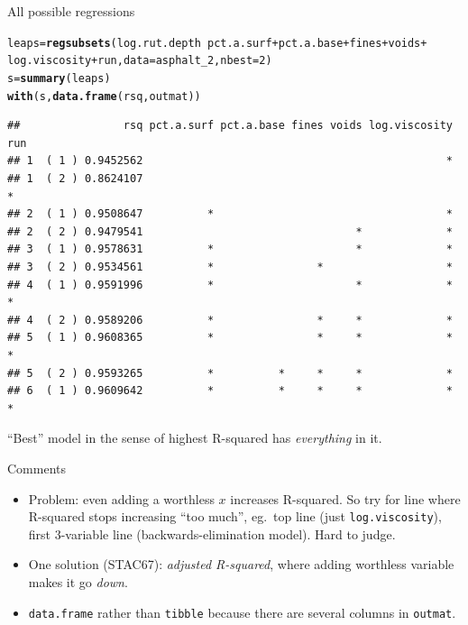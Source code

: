 \documentclass[unknownkeysallowed]{beamer}\usepackage[]{graphicx}\usepackage[]{color}
\makeatletter
\newcommand{\hlnum}[1]{\textcolor[rgb]{0.686,0.059,0.569}{#1}}%
\newcommand{\hlopt}[1]{\textcolor[rgb]{0,0,0}{#1}}%
\newcommand{\hlstd}[1]{\textcolor[rgb]{0.345,0.345,0.345}{#1}}%
\newcommand{\hlkwb}[1]{\textcolor[rgb]{0.69,0.353,0.396}{#1}}%
\newcommand{\hlkwc}[1]{\textcolor[rgb]{0.333,0.667,0.333}{#1}}%
\newcommand{\hlkwd}[1]{\textcolor[rgb]{0.737,0.353,0.396}{\textbf{#1}}}%
\newenvironment{kframe}{%
 \def\at@end@of@kframe{}%
 \ifinner\ifhmode%
  \def\at@end@of@kframe{\end{minipage}}%
  \begin{minipage}{\columnwidth}%
 \fi\fi%
 \def\FrameCommand##1{\hskip\@totalleftmargin \hskip-\fboxsep
 \colorbox{shadecolor}{##1}\hskip-\fboxsep
     \hskip-\linewidth \hskip-\@totalleftmargin \hskip\columnwidth}%
 \MakeFramed {\advance\hsize-\width
   \@totalleftmargin\z@ \linewidth\hsize
   \@setminipage}}%
 {\par\unskip\endMakeFramed%
 \at@end@of@kframe}
\newenvironment{knitrout}{}{} %
\makeatother
\begin{document}
\begin{frame}[fragile]{All possible regressions}


\begin{knitrout}\scriptsize
{}\color{fgcolor}\begin{kframe}
\begin{alltt}
\hlstd{leaps}\hlkwb{=}\hlkwd{regsubsets}\hlstd{(log.rut.depth}\hlopt{~}\hlstd{pct.a.surf}\hlopt{+}\hlstd{pct.a.base}\hlopt{+}\hlstd{fines}\hlopt{+}\hlstd{voids}\hlopt{+}
  \hlstd{log.viscosity}\hlopt{+}\hlstd{run,}\hlkwc{data}\hlstd{=asphalt_2,}\hlkwc{nbest}\hlstd{=}\hlnum{2}\hlstd{)}
\hlstd{s}\hlkwb{=}\hlkwd{summary}\hlstd{(leaps)}
\hlkwd{with}\hlstd{(s,}\hlkwd{data.frame}\hlstd{(rsq,outmat))}
\end{alltt}
\begin{verbatim}
##                rsq pct.a.surf pct.a.base fines voids log.viscosity run
## 1  ( 1 ) 0.9452562                                               *    
## 1  ( 2 ) 0.8624107                                                   *
## 2  ( 1 ) 0.9508647          *                                    *    
## 2  ( 2 ) 0.9479541                                 *             *    
## 3  ( 1 ) 0.9578631          *                      *             *    
## 3  ( 2 ) 0.9534561          *                *                   *    
## 4  ( 1 ) 0.9591996          *                      *             *   *
## 4  ( 2 ) 0.9589206          *                *     *             *    
## 5  ( 1 ) 0.9608365          *                *     *             *   *
## 5  ( 2 ) 0.9593265          *          *     *     *             *    
## 6  ( 1 ) 0.9609642          *          *     *     *             *   *
\end{verbatim}
\end{kframe}
\end{knitrout}

``Best'' model in the sense of highest R-squared has \emph{everything}
in it.

  
\end{frame}


\begin{frame}[fragile]{Comments}

  \begin{itemize}
  \item Problem: even adding a worthless $x$ increases R-squared. So
    try for line where R-squared stops increasing ``too much'', eg.\
    top line (just \texttt{log.viscosity}), first 3-variable line
    (backwards-elimination model). Hard to judge.
  \item One solution (STAC67): \emph{adjusted R-squared}, where adding
    worthless variable makes it go \emph{down}.
  \item \texttt{data.frame} rather than \texttt{tibble} because there
    are several columns in \texttt{outmat}.
  \end{itemize}
  
\end{frame}
\end{document}
